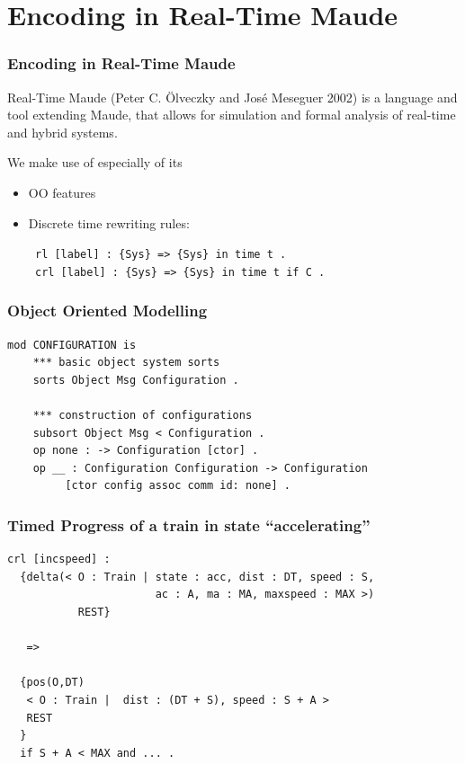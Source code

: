 \documentclass{beamer}
\begin{document}
\section{Encoding in Real-Time Maude}


\begin{frame}
\frametitle{Encoding in  Real-Time Maude}

Real-Time Maude (Peter C. \"Olveczky and Jos\'e Meseguer 2002) is a language and tool extending Maude, that allows for simulation and formal analysis of real-time and hybrid
systems.

\medskip

We make use of especially of its
\begin{itemize}

\item OO features

\item \alert{Discrete} time rewriting rules:
%
\begin{flushleft}
\texttt{  rl  [label] : \{Sys\} => \{Sys\} in time t .}\\
\texttt{  crl [label] : \{Sys\} => \{Sys\} in time t if C .} 
\end{flushleft}



\end{itemize}
\end{frame}
\begin{frame}[fragile]
\frametitle{Object Oriented Modelling}
\begin{verbatim}
mod CONFIGURATION is  
    *** basic object system sorts  
    sorts Object Msg Configuration .  
 
    *** construction of configurations  
    subsort Object Msg < Configuration .  
    op none : -> Configuration [ctor] .  
    op __ : Configuration Configuration -> Configuration  
         [ctor config assoc comm id: none] .
\end{verbatim}
\end{frame}

\begin{frame}[fragile]
\frametitle{Timed Progress of a train in state ``accelerating''}
\begin{verbatim}
crl [incspeed] : 
  {delta(< O : Train | state : acc, dist : DT, speed : S, 
                       ac : A, ma : MA, maxspeed : MAX >)
           REST}

   => 

  {pos(O,DT) 
   < O : Train |  dist : (DT + S), speed : S + A > 
   REST
  } 
  if S + A < MAX and ... .
\end{verbatim}
\end{frame}
\end{document}
